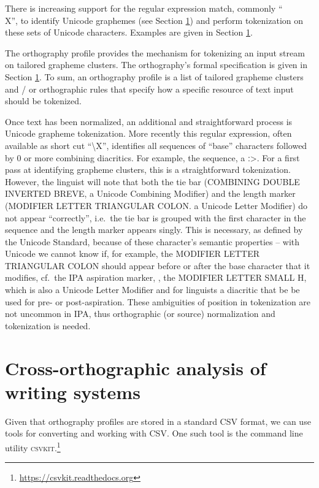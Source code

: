 There is increasing support for the regular expression match, commonly ``\\X'',
to identify Unicode graphemes (see Section \ref{}) and perform tokenization on
these sets of Unicode characters. Examples are given in Section \ref{}.

The orthography profile provides the mechanism for tokenizing an input stream on
tailored grapheme clusters. The orthography's formal specification is given in
Section \ref{}. To sum, an orthography profile is a list of tailored grapheme
clusters and / or orthographic rules that specify how a specific resource of
text input should be tokenized. 

Once text has been normalized, an additional and straightforward process is
Unicode grapheme tokenization. More recently this regular expression, often
available as short cut ``\textbackslash{X}'', identifies all sequences of
``base'' characters followed by 0 or more combining diacritics. For example, the
sequence, %
a ː>. For a first pass at identifying grapheme clusters, this is a
straightforward tokenization. However, the linguist will note that both the tie
bar (COMBINING DOUBLE INVERTED BREVE, a Unicode Combining Modifier) and the
length marker (MODIFIER LETTER TRIANGULAR COLON. a Unicode Letter Modifier) do
not appear ``correctly'', i.e.~the tie bar is grouped with the first character
in the sequence and the length marker appears singly. This is necessary, as
defined by the Unicode Standard, because of these character's semantic
properties -- with Unicode we cannot know if, for example, the MODIFIER LETTER
TRIANGULAR COLON should appear before or after the base character that it
modifies, cf.~the IPA aspiration marker, , the MODIFIER LETTER SMALL H, which is
also a Unicode Letter Modifier and for linguists a diacritic that be be used for
pre- or post-aspiration. These ambiguities of position in tokenization are not
uncommon in IPA, thus orthographic (or source) normalization and tokenization is
needed.

\section{Cross-orthographic analysis of writing systems}

Given that orthography profiles are stored in a standard CSV format, we can use tools for converting and working with CSV. One such tool is the command line utility \textsc{csvkit}.\footnote{\url{https://csvkit.readthedocs.org}}

